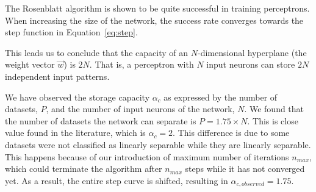 The Rosenblatt algorithm is shown to be quite successful in training perceptrons.
When increasing the size of the network, the success rate converges towards the step function in Equation~\ref{eq:step}.

This leads us to conclude that the capacity of an \(N\)-dimensional hyperplane (the weight vector \(\vec{w}\)) is \(2N\).
That is, a perceptron with \(N\) input neurons can store \(2N\) independent input patterns.

We have observed the storage capacity $\alpha_c$ as expressed by the number of datasets, $P$, and the number of input neurons of the network, $N$. We found that the number of datasets the network can separate is $P = 1.75 \times N$. This is close value found in the literature, which is $\alpha_c = 2$. This difference is due to some datasets were not classified as linearly separable while they are linearly separable. This happens because of our introduction of maximum number of iterations $n_{max}$, which could terminate the algorithm after $n_{max}$ steps while it has not converged yet. As a result, the entire step curve is shifted, resulting in $\alpha_{c, observed} = 1.75$.